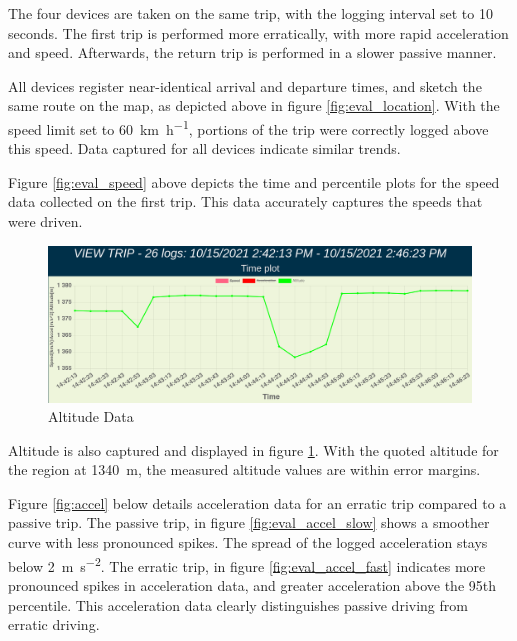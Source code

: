 The four devices are taken on the same trip, with the logging interval set to 10 seconds.
The first trip is performed more erratically, with more rapid acceleration and speed.
Afterwards, the return trip is performed in a slower passive manner.

All devices register near-identical arrival and departure times, and sketch the same route on the map, as depicted above in figure \ref{fig:eval_location}.
With the speed limit set to \SI{60}{\kilo\meter\per\hour}, portions of the trip were correctly logged above this speed.
Data captured for all devices indicate similar trends.

Figure \ref{fig:eval_speed} above depicts the time and percentile plots for the speed data collected on the first trip.
This data accurately captures the speeds that were driven.

\begin{figure}[H]
\centering
\includegraphics[width=5in]{eval_altitude.png}
\caption{Altitude Data}
\label{fig:eval_altitude}
\end{figure}

Altitude is also captured and displayed in figure \ref{fig:eval_altitude}.
With the quoted altitude for the region at \SI{1340}{ \metre }, the measured altitude values are within error margins.

Figure \ref{fig:accel} below details acceleration data for an erratic trip compared to a passive trip.
The passive trip, in figure \ref{fig:eval_accel_slow} shows a smoother curve with less pronounced spikes. The spread of the logged acceleration stays below \SI{2}{\metre \per \square \second}.
The erratic trip, in figure \ref{fig:eval_accel_fast} indicates more pronounced spikes in acceleration data, and greater acceleration above the 95th percentile.
This acceleration data clearly distinguishes passive driving from erratic driving.

